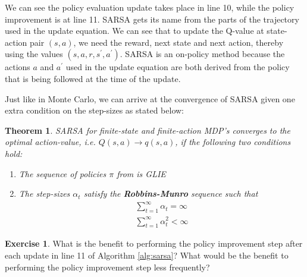 \documentclass{article}
\newtheorem{theorem}{Theorem}[section]
\theoremstyle{definition}
\newtheorem{exercise}{Exercise}[section]
\theoremstyle{remark}
\begin{document}
We can see the policy evaluation update takes place in line 10, while the policy improvement is at line 11.  SARSA gets its name from the parts of the trajectory used in the update equation.  We can see that to update the Q-value at state-action pair $(s, a)$, we need the reward, next state and next action, thereby using the values $(s, a, r, s^\prime, a^\prime)$.  SARSA is an on-policy method because the actions $a$ and $a^\prime$ used in the update equation are both derived from the policy that is being followed at the time of the update.

Just like in Monte Carlo, we can arrive at the convergence of SARSA given one extra condition on the step-sizes as stated below:

\begin{theorem}
SARSA for finite-state and finite-action MDP's converges to the optimal action-value, i.e. $Q(s,a) \rightarrow q(s,a)$, if the following two conditions hold:
\begin{enumerate}[noitemsep,partopsep=0pt,topsep=0pt,parsep=0pt]
	\item The sequence of policies $\pi$ from is GLIE
	\item The step-sizes $\alpha_t$ satisfy the \textbf{Robbins-Munro} sequence such that
\begin{align*}
\sum_{t=1}^\infty \alpha_t = \infty \\
\sum_{t=1}^\infty \alpha_t^2 < \infty
\end{align*}
\end{enumerate}
\end{theorem}

\begin{exercise}
What is the benefit to performing the policy improvement step after each update in line 11 of Algorithm \ref{alg:sarsa}?  What would be the benefit to performing the policy improvement step less frequently?
\end{exercise}
\end{document}
